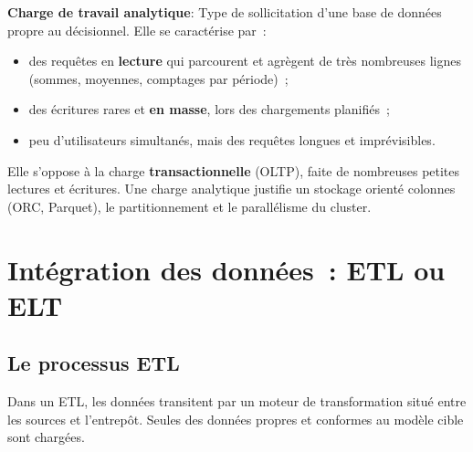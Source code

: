 \noindent \textbf{Charge de travail analytique}:
\noindent Type de sollicitation d'une base de données propre au décisionnel. Elle se caractérise par~:
\begin{itemize}
	\item des requêtes en \textbf{lecture} qui parcourent et agrègent de très nombreuses lignes (sommes, moyennes, comptages par période)~;
	\item des écritures rares et \textbf{en masse}, lors des chargements planifiés~;
	\item peu d'utilisateurs simultanés, mais des requêtes longues et imprévisibles.
\end{itemize}
Elle s'oppose à la charge \textbf{transactionnelle} (OLTP), faite de nombreuses petites lectures et écritures. Une charge analytique justifie un stockage orienté colonnes (ORC, Parquet), le partitionnement et le parallélisme du cluster.

\newpage
\section{Intégration des données~: ETL ou ELT}\label{sec:etl-elt}

\subsection{Le processus ETL}

\noindent Dans un ETL, les données transitent par un moteur de transformation situé entre les sources et l'entrepôt. Seules des données propres et conformes au modèle cible sont chargées.

\begin{center}
\end{center}

